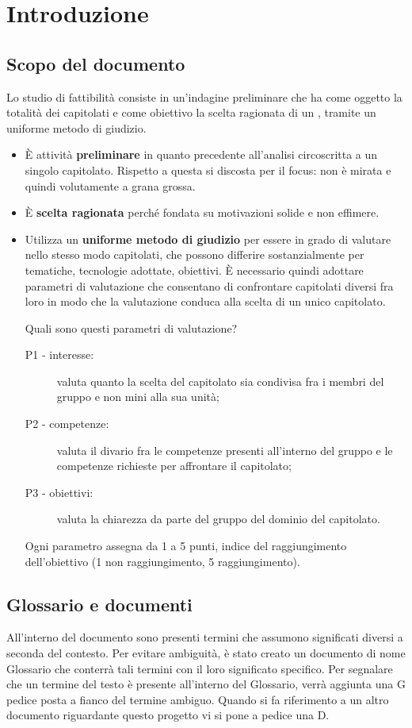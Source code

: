 \section{Introduzione}

\subsection{Scopo del documento}
Lo studio di fattibilità consiste in un'indagine preliminare che ha come oggetto la totalità dei capitolati e come obiettivo la scelta ragionata di un , tramite un uniforme metodo di giudizio. 
\begin{itemize}
	\item È attività \textbf{preliminare} in quanto precedente all'analisi circoscritta a un singolo capitolato. Rispetto a questa si discosta per il focus: non è mirata e quindi volutamente a grana grossa. 
	\item È \textbf{scelta ragionata} perché fondata su motivazioni solide e non effimere.
	\item Utilizza un \textbf{uniforme metodo di giudizio} per essere in grado di valutare nello stesso modo capitolati, che possono differire sostanzialmente per tematiche, tecnologie adottate, obiettivi. È necessario quindi adottare parametri di valutazione che consentano di confrontare capitolati diversi fra loro in modo che la valutazione conduca alla scelta di un unico capitolato. 
	
	Quali sono questi parametri di valutazione? 
	\begin{description}
		\item[P1 - interesse:] valuta quanto la scelta del capitolato sia condivisa fra i membri del gruppo e non mini alla sua unità;
		\item[P2 - competenze:] valuta il divario fra le competenze presenti all'interno del gruppo e le competenze richieste per affrontare il capitolato;
		\item[P3 - obiettivi:] valuta la chiarezza da parte del gruppo del dominio del capitolato. 
	\end{description}
	Ogni parametro assegna da 1 a 5 punti, indice del raggiungimento dell'obiettivo (1 non raggiungimento, 5 raggiungimento).
\end{itemize}
 
\subsection{Glossario e documenti} 
All'interno del  documento sono presenti termini che assumono significati diversi a seconda del contesto.
Per evitare ambiguità, è stato creato un  documento di nome Glossario che  conterrà tali termini con il loro significato specifico. Per segnalare che un termine del testo è presente all'interno del Glossario, verrà aggiunta una G pedice posta a fianco del termine ambiguo.
Quando si fa riferimento a un altro documento riguardante questo progetto vi si pone a pedice una D.

